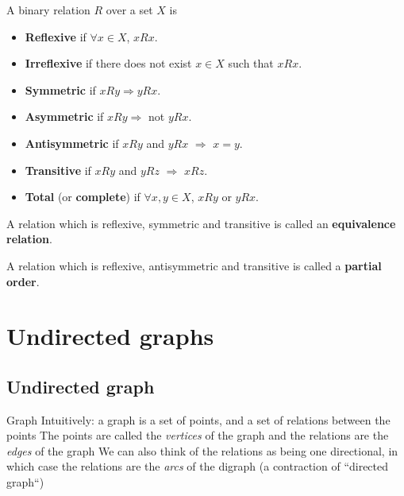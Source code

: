 \documentclass[aspectratio=169]{beamer}
\begin{document}
\begin{frame}
	\begin{definition}
		A binary relation $R$ over a set $X$ is
	\begin{itemize}
	\item \textbf{Reflexive} if $\forall x\in X$, $xRx$.
	\item \textbf{Irreflexive} if there does not exist $x\in X$ such that $xRx$.
	\item \textbf{Symmetric} if $xRy \Rightarrow yRx$.
	\item \textbf{Asymmetric} if $xRy \Rightarrow $ not $y R x$.
	\item \textbf{Antisymmetric} if $xRy$ and $yRx$ $\Rightarrow$ $x=y$.
	\item \textbf{Transitive} if $xRy$ and $yRz$ $\Rightarrow$  $xRz$.
	\item \textbf{Total} (or \textbf{complete}) if $\forall x, y\in X$, $x R y$ or $y R x$.
	\end{itemize}
	\end{definition}
\end{frame}
	
	
\begin{frame} 
	\begin{definition}
	 A relation which is reflexive, symmetric and transitive is called an \textbf{equivalence relation}. 
	 \end{definition}
	 \begin{definition}
	 A relation which is reflexive, antisymmetric and transitive is called a \textbf{partial order}. 
	 \end{definition}
\end{frame}
	



\section{Undirected graphs}


\subsection{Undirected graph}


\begin{frame}{Graph}
	Intuitively: a graph is a set of points, and a set of relations between the points
	\vfill
	The points are called the \emph{vertices} of the graph and the relations are the \emph{edges} of the graph
	\vfill
	We can also think of the relations as being one directional, in which case the relations are the \emph{arcs} of the digraph (a contraction of ``directed graph``)
\end{frame}
\end{document}
